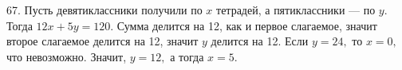 67. Пусть девятиклассники получили по $x$ тетрадей, а пятиклассники --- по $y.$ Тогда $12x+5y=120.$ Сумма делится на 12, как и первое слагаемое, значит второе слагаемое делится на 12, значит $y$ делится на 12. Если $y=24,$ то $x=0,$ что невозможно. Значит, $y=12,$ а тогда $x=5.$\\
